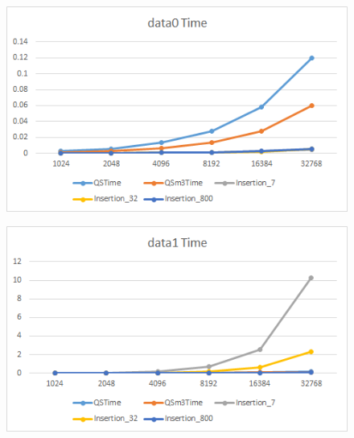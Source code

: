 \documentclass[conference]{IEEEtran}
\begin{document}
\begin{figure}[H]
    \centerline{\includegraphics[scale=0.65]{Pic/pic10.png}}
\end{figure}

\begin{figure}[H]
    \centerline{\includegraphics[scale=0.65]{Pic/pic11.png}}
\end{figure}
\end{document}
